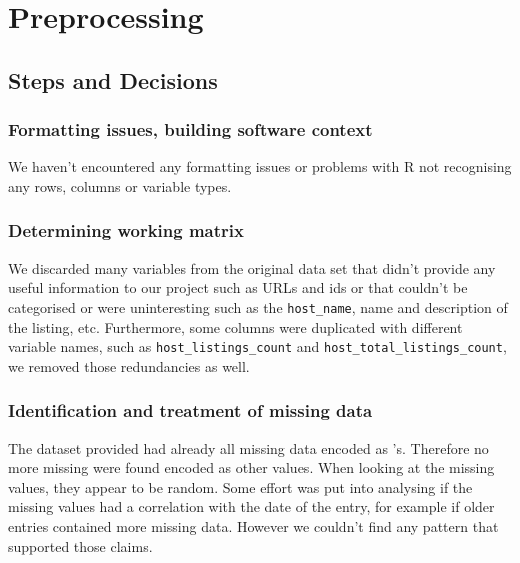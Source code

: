 

\section{Preprocessing}%
\label{sec:preprocessing}


\subsection{Steps and Decisions}%
\label{sub:steps-decisions}

\subsubsection{Formatting issues, building software context}

We haven't encountered any formatting issues or problems with R not recognising
any rows, columns or variable types.

\subsubsection{Determining working matrix}%
\label{ssub:work_matrix}

We discarded many variables from the original data set that didn't provide any
useful information to our project such as URLs and ids or that couldn't be
categorised or were uninteresting such as the \texttt{host\_name}, name and
description of the listing, etc. Furthermore, some columns were duplicated with
different variable names, such as \texttt{host\_listings\_count} and
\texttt{host\_total\_listings\_count}, we removed those redundancies as well.

\subsubsection{Identification and treatment of missing data}

The dataset provided had already all missing data encoded as \NA's. Therefore no
more missing were found encoded as other values. When looking at the missing
values, they appear to be random. Some effort was put into analysing if the missing values had a correlation with the date of the entry, for example if older entries contained more missing data. However we couldn't find any pattern that supported those claims.

